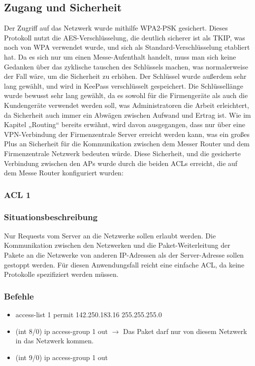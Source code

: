 \subsection{Zugang und Sicherheit}
Der Zugriff auf das Netzwerk wurde mithilfe WPA2-PSK gesichert. Dieses Protokoll nutzt die AES-Verschlüsselung, die deutlich sicherer ist als TKIP, was noch von WPA verwendet wurde, und sich als Standard-Verschlüsselung etabliert hat. Da es sich nur um einen Messe-Aufenthalt handelt, muss man sich keine Gedanken über das zyklische tauschen des Schlüssels machen, was normalerweise der Fall wäre, um die Sicherheit zu erhöhen. Der Schlüssel wurde außerdem sehr lang gewählt, und wird in KeePass verschlüsselt gespeichert. Die Schlüssellänge wurde bewusst sehr lang gewählt, da es sowohl für die Firmengeräte als auch die Kundengeräte verwendet werden soll, was Administratoren die Arbeit erleichtert, da Sicherheit auch immer ein Abwägen zwischen Aufwand und Ertrag ist.
Wie im Kapitel „Routing“ bereits erwähnt, wird davon ausgegangen, dass nur über eine VPN-Verbindung der Firmenzentrale Server erreicht werden kann, was ein großes Plus an Sicherheit für die Kommunikation zwischen dem Messer Router und dem Firmenzentrale Netzwerk bedeuten würde. Diese Sicherheit, und die gesicherte Verbindung zwischen den APs wurde durch die beiden ACLs erreicht, die auf dem Messe Router konfiguriert wurden:

\subsubsection{ACL 1}
\subsubsection{Situationsbeschreibung}
Nur Requests vom Server an die Netzwerke sollen erlaubt werden. Die Kommunikation zwischen den Netzwerken und die Paket-Weiterleitung der Pakete an die Netzwerke von anderen IP-Adressen als der Server-Adresse sollen gestoppt werden. Für diesen Anwendungsfall reicht eine einfache ACL, da keine Protokolle spezifiziert werden müssen.

\subsubsection{Befehle}
\begin{itemize}
	\item access-list 1 permit 142.250.183.16 255.255.255.0
	\item (int 8/0) ip access-group 1 out $\rightarrow$ Das Paket darf nur von diesem Netzwerk in das Netzwerk kommen.
	\item (int 9/0) ip access-group 1 out
\end{itemize}

